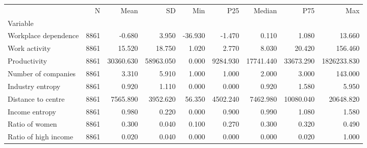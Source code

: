 \begin{table}
\label{tab:summary_stats_absolute}
\begin{tabular}{lrrrrrrrr}
\toprule
 & N & Mean & SD & Min & P25 & Median & P75 & Max \\
Variable &  &  &  &  &  &  &  &  \\
\midrule
Workplace dependence & 8861 & -0.680 & 3.950 & -36.930 & -1.470 & 0.110 & 1.080 & 13.660 \\
Work activity & 8861 & 15.520 & 18.750 & 1.020 & 2.770 & 8.030 & 20.420 & 156.460 \\
Productivity & 8861 & 30360.630 & 58963.050 & 0.000 & 9284.930 & 17741.440 & 33673.290 & 1826233.830 \\
Number of companies & 8861 & 3.310 & 5.910 & 1.000 & 1.000 & 2.000 & 3.000 & 143.000 \\
Industry entropy & 8861 & 0.920 & 1.110 & 0.000 & 0.000 & 0.920 & 1.580 & 5.950 \\
Distance to centre & 8861 & 7565.890 & 3952.620 & 56.350 & 4502.240 & 7462.980 & 10080.040 & 20648.820 \\
Income entropy & 8861 & 0.980 & 0.220 & 0.000 & 0.900 & 0.990 & 1.080 & 1.580 \\
Ratio of women & 8861 & 0.300 & 0.040 & 0.100 & 0.270 & 0.300 & 0.320 & 0.490 \\
Ratio of high income & 8861 & 0.020 & 0.040 & 0.000 & 0.000 & 0.000 & 0.020 & 1.000 \\
\bottomrule
\end{tabular}
\end{table}
